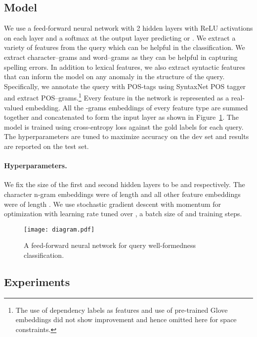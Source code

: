 \documentclass[11pt,a4paper]{article}
\begin{document}
\subsection{Model}
\label{sec:model}

We use a feed-forward neural network with 2 hidden layers
with ReLU activations \cite{relu} on each layer and a softmax at the output layer
predicting  or . 
We extract
a variety of features from the query which can be helpful in the classification. We
extract character--grams and word--grams as they can be helpful in capturing
spelling errors. In addition to lexical features, we also extract syntactic features that
can inform the model on any anomaly in the structure of the query. Specifically, we
annotate the query with POS-tags using SyntaxNet POS tagger
\cite{alberti-EtAl:2015:EMNLP} and extract POS--grams.\footnote{The use of dependency labels as features and use of pre-trained Glove embeddings
did not show improvement and hence omitted here for space constraints.}
Every feature in the network is represented as a real-valued embedding. All the -grams
embeddings of every feature type are summed together and concatenated to form the input layer as shown in Figure~\ref{fig:model}.
The model is trained using cross-entropy loss against the gold labels for each
query. The hyperparameters are tuned to maximize accuracy
on the dev set and results are reported on the test set.

\paragraph{Hyperparameters.} 
We fix the size of the first and second hidden layers to be
 and  respectively. The character n-gram embeddings were of length 
and all other  feature embeddings were of length . We use stochastic gradient
descent with momentum  for optimization with learning rate tuned over
, a batch size of  and  training steps.

\begin{figure}[!tb]
    \centering
    \texttt{[image: diagram.pdf]}
    \caption{A feed-forward neural network for query well-formedness classification.}
    \label{fig:model}
\end{figure}

\subsection{Experiments}
\end{document}
